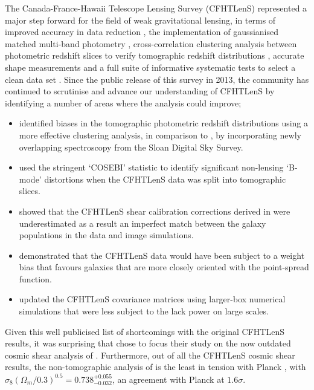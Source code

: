 The Canada-France-Hawaii Telescope Lensing Survey (CFHTLenS) represented a major step forward for the field of weak gravitational lensing, in terms of improved accuracy in data reduction \citep{erben/etal:2013}, the implementation of gaussianised matched multi-band photometry \citep{hildebrandt/etal:2012}, cross-correlation clustering analysis between photometric redshift slices to verify tomographic redshift distributions \citep{benjamin/etal:2013}, accurate shape measurements \citep{miller/etal:2013} and a full suite of informative systematic tests to select a clean data set \citep{heymans/etal:2012}.    Since the public release of this survey in 2013, the community has continued to scrutinise and advance our understanding of CFHTLenS by identifying a number of areas where the analysis could improve;
\begin{itemize}
\item{\citet{choi/etal:2016} identified biases in the tomographic photometric redshift distributions using a more effective clustering analysis, in comparison to \citet{benjamin/etal:2013}, by incorporating newly overlapping spectroscopy from the Sloan Digital Sky Survey.}
\item{\citet{asgari/etal:2016} used the stringent `COSEBI' statistic to identify significant non-lensing `B-mode' distortions when the CFHTLenS data was split into tomographic slices.}
\item{\citet{kuijken/etal:2015} showed that the CFHTLenS shear calibration corrections derived in \citet{miller/etal:2013} were underestimated as a result an imperfect match between the galaxy populations in the data and image simulations.}
\item{\citet{fenechconti/etal:2016} demonstrated that the CFHTLenS data would have been subject to a weight bias that favours galaxies that are more closely oriented with the point-spread function.}
\item{\citet{joudaki/etal:2016} updated the CFHTLenS covariance matrices using larger-box numerical simulations that were less subject to the lack power on large scales.}
\end{itemize}
Given this well publicised list of shortcomings with the original CFHTLenS results, it was surprising that \citet{kitching/etal:2016} chose to focus their study on the now outdated cosmic shear analysis of \citet{kilbinger/etal:2013}.  Furthermore, out of all the CFHTLenS cosmic shear results, the non-tomographic analysis of \citet{kilbinger/etal:2013} is the least in tension with Planck \citep[see for example][]{fu/etal:2014,abbott/etal:2016}, with $\sigma_8 (\Omega_m/0.3)^{0.5} = 0.738^{+0.055}_{-0.032}$, an agreement with Planck at $1.6 \sigma$. 

